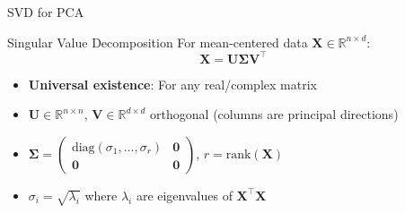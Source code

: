 \documentclass{beamer}
\begin{document}
\begin{frame}{SVD for PCA}
    \begin{block}{Singular Value Decomposition}
        For mean-centered data $\mathbf{X} \in \mathbb{R}^{n \times d}$:
        \[
        \mathbf{X} = \mathbf{U}\mathbf{\Sigma}\mathbf{V}^\top
        \]
        \begin{itemize}
            \item \textbf{Universal existence}: For any real/complex matrix
            \item $\mathbf{U} \in \mathbb{R}^{n \times n}$, $\mathbf{V} \in \mathbb{R}^{d \times d}$ orthogonal (columns are principal directions)
            \item $\mathbf{\Sigma} = \begin{pmatrix}
                \text{diag}(\sigma_1, \ldots, \sigma_r) & \mathbf{0} \\
                \mathbf{0} & \mathbf{0}
            \end{pmatrix}$, $r = \text{rank}(\mathbf{X})$
            \item $\sigma_i = \sqrt{\lambda_i}$ where $\lambda_i$ are eigenvalues of $\mathbf{X}^\top\mathbf{X}$
        \end{itemize}
    \end{block}
\end{frame}




\end{document}
